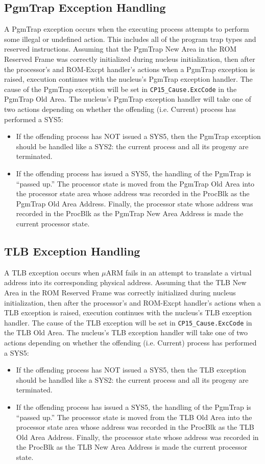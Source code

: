 \subsection{PgmTrap Exception Handling}
A PgmTrap exception occurs when the executing process attempts to perform
some illegal or undefined action. 
This includes all of the program trap types and reserved instructions. Assuming that the PgmTrap New Area in the ROM
Reserved Frame was correctly initialized during nucleus initialization, then after
the processor's and ROM-Excpt handler's actions when a PgmTrap exception is
raised, execution continues with the nucleus's PgmTrap exception handler. The
cause of the PgmTrap exception will be set in \verb+CP15_Cause.ExcCode+ in the PgmTrap
Old Area.
The nucleus's PgmTrap exception handler will take one of two actions depending on whether 
the offending (i.e. Current) process has performed a SYS5:
\begin{itemize}
\item If the offending process has NOT issued a SYS5,
then the PgmTrap exception should be handled like a SYS2: the current
process and all its progeny are terminated.
\item If the offending process has issued a SYS5, the
handling of the PgmTrap is “passed up.” The processor state is moved
from the PgmTrap Old Area into the processor state area whose address
was recorded in the ProcBlk as the PgmTrap Old Area Address. Finally, the
processor state whose address was recorded in the ProcBlk as the PgmTrap
New Area Address is made the current processor state.
\end{itemize}
\subsection{TLB Exception Handling}
A TLB exception occurs when $\mu$ARM fails in an attempt to translate a virtual
address into its corresponding physical address. 
Assuming that the TLB New Area in the ROM Reserved Frame was correctly initialized during nucleus initialization,
then after the processor's and ROM-Excpt handler's actions when a TLB exception is raised, execution continues with the nucleus's TLB exception handler. The
cause of the TLB exception will be set in \verb+CP15_Cause.ExcCode+ in the TLB Old Area.
The nucleus's TLB exception handler will take one of two actions depending
on whether the offending (i.e. Current) process has performed a SYS5:
\begin{itemize}
\item If the offending process has NOT issued a SYS5, then
the TLB exception should be handled like a SYS2: the current process and
all its progeny are terminated.
\item If the offending process has issued a SYS5, the handling
of the PgmTrap is “passed up.” The processor state is moved from the TLB
Old Area into the processor state area whose address was recorded in the
ProcBlk as the TLB Old Area Address. Finally, the processor state whose
address was recorded in the ProcBlk as the TLB New Area Address is made
the current processor state.
\end{itemize}
